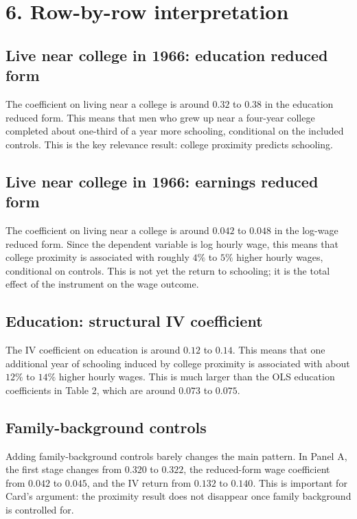 \documentclass[11pt,a4paper]{article}
\begin{document}
\section*{6. Row-by-row interpretation}

\subsection*{Live near college in 1966: education reduced form}

The coefficient on living near a college is around \(0.32\) to \(0.38\) in the education reduced form. This means that men who grew up near a four-year college completed about one-third of a year more schooling, conditional on the included controls. This is the key relevance result: college proximity predicts schooling.

\subsection*{Live near college in 1966: earnings reduced form}

The coefficient on living near a college is around \(0.042\) to \(0.048\) in the log-wage reduced form. Since the dependent variable is log hourly wage, this means that college proximity is associated with roughly \(4\%\) to \(5\%\) higher hourly wages, conditional on controls. This is not yet the return to schooling; it is the total effect of the instrument on the wage outcome.

\subsection*{Education: structural IV coefficient}

The IV coefficient on education is around \(0.12\) to \(0.14\). This means that one additional year of schooling induced by college proximity is associated with about \(12\%\) to \(14\%\) higher hourly wages. This is much larger than the OLS education coefficients in Table 2, which are around \(0.073\) to \(0.075\).

\subsection*{Family-background controls}

Adding family-background controls barely changes the main pattern. In Panel A, the first stage changes from \(0.320\) to \(0.322\), the reduced-form wage coefficient from \(0.042\) to \(0.045\), and the IV return from \(0.132\) to \(0.140\). This is important for Card's argument: the proximity result does not disappear once family background is controlled for.
\end{document}
